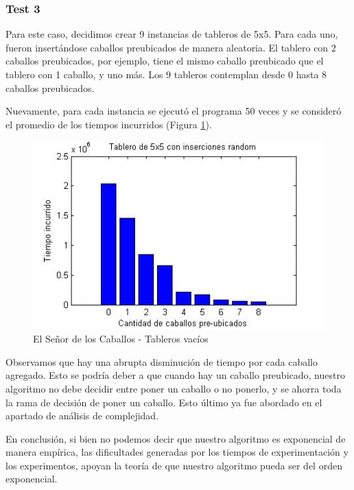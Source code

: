 \vspace*{0.6cm}

\subsubsection{Test 3}

\vspace*{0.3cm}

Para este caso, decidimos crear 9 instancias de tableros de 5x5.  Para cada uno, fueron insertándose caballos preubicados de manera aleatoria.  El tablero con 2 caballos preubicados, por ejemplo, tiene el mismo caballo preubicado que el tablero con 1 caballo, y uno más.  Los 9 tableros contemplan desde 0 hasta 8 caballos preubicados.

Nuevamente, para cada instancia se ejecutó el programa 50 veces y se consideró el promedio de los tiempos incurridos (Figura \ref{fig:3-random}).

\begin{figure}[htb]
	\begin{center}
    		\includegraphics[scale=0.5]{imagenes/3-random.jpg}
	\end{center}
	\caption{El Señor de los Caballos - Tableros vacíos}\label{fig:3-random}
\end{figure}

Observamos que hay una abrupta disminución de tiempo por cada caballo agregado. Esto se podría deber a que cuando hay un caballo preubicado, nuestro algoritmo no debe decidir entre poner un caballo o no ponerlo, y se ahorra toda la rama de decisión de poner un caballo. Esto último ya fue abordado en el apartado de análisis de complejidad.

En conclusión, si bien no podemos decir que nuestro algoritmo es exponencial de manera empírica, las dificultades generadas por los tiempos de experimentación y los experimentos, apoyan la teoría de que nuestro algoritmo pueda ser del orden exponencial.